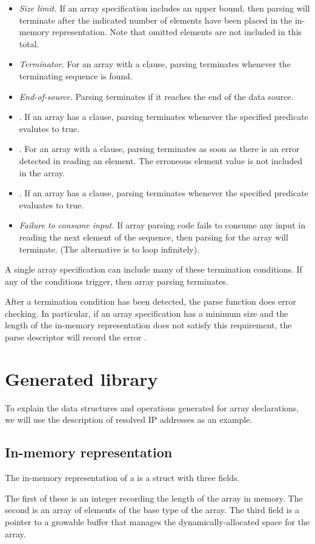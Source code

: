 \begin{itemize}
\item{\textit{Size limit.}} If an array specification includes an upper bound,
  then parsing will terminate after the indicated number of elements
  have been placed in the in-memory representation.  Note that omitted
  elements are not included in this total.
\item\textit{Terminator.} For an array with a \Pterm{} clause, parsing
  terminates whenever the terminating sequence is found.
\item\textit{End-of-source.} Parsing terminates if it reaches the end of the
  data source.
\item{\Plast{}.} If an array has a \Plast{} clause, parsing terminates
  whenever the specified predicate evalutes to true.
\item{\Plongest{}.} For an array with a \Plongest{} clause, parsing terminates
  as soon as there is an error detected in reading an element.  The
  erroneous element value is not included in the array.
\item{\Pended{}.} If an array has a \Pended{} clause, parsing
  terminates whenever the specified predicate evaluates to true.
\item{\textit{Failure to consume input.}} If array parsing code fails
  to consume any input in reading the next element of the sequence,
  then parsing for the array will terminate.  (The alternative is to
  loop infinitely).
\end{itemize}
A single array specification can include many of these termination
conditions.  If any of the conditions trigger, then array parsing
terminates.  

After a termination condition has been detected, the parse function
does error checking.  In particular,
if an array specification has a minimum size and the
length of the in-memory representation does not satisfy this
requirement, the parse descriptor will record the error 
.  


\section{Generated library}
To explain the data structures and operations generated for array
declarations, we will use the description of resolved IP addresses as
an example.


\subsection{In-memory representation}
\label{sec:arrays-rep}
The in-memory representation of a \Parray{} is a struct with three
fields.  

The first of these is an integer recording the length of the
array in memory.  The second is an array of elements of the base type
of the array.  The third field is a pointer to a growable buffer that
manages the dynamically-allocated space for the array.

